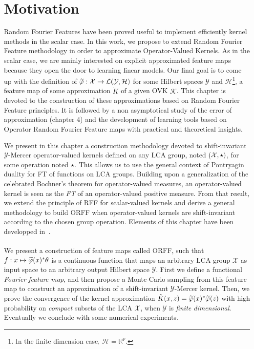 
\section{Motivation}
\label{sec:motivations}
Random Fourier Features have been proved useful to implement efficiently kernel
methods in the scalar case. In this work, we propose to extend Random Fourier
Feature methodology in order to approximate Operator-Valued Kernels. As in the
scalar case, we are mainly interested on explicit approximated feature maps
because they open the door to learning linear models. Our final goal is to come
up with the definition of $\tildePhi{\omega}: \mathcal{X} \to
\mathcal{L}(\mathcal{Y},\mathcal{H})$ for some Hilbert spaces $\mathcal{Y}$ and
$\mathcal{H}$\footnote{In the finite dimension case, $\mathcal{H}=
\mathbb{R}^p$.}, a feature map of some approximation $\tilde{K}$ of a given
\acs{OVK} $\mathcal{K}$.  This chapter is devoted to the construction of these
approximations based on Random Fourier Feature principles. It is followed by a
non asymptotical study of the error of approximation (chapter 4) and the
development of learning tools based on Operator Random Fourier Feature maps
with practical and theoretical insights. 

We present in this chapter a construction methodology devoted to
shift-invariant $\mathcal{Y}$-Mercer operator-valued kernels defined on any
\acf{LCA} group, noted ($\mathcal{X}, \star)$, for some operation noted
$\star$. This allows us to use the general context of Pontryagin duality for
\acl{FT} of functions on \acs{LCA} groups. Building upon a generalization of
the celebrated Bochner's theorem for operator-valued measures, an
operator-valued kernel is seen as the \emph{\acl{FT}} of an operator-valued
positive measure. From that result, we extend the principle of \acs{RFF} for
scalar-valued kernels and derive a general methodology to build \acf{ORFF} when
operator-valued kernels are shift-invariant according to the chosen group
operation. Elements of this chapter have been developped
in~\citet{brault2016random}.
\paragraph{}
We present a construction of feature maps called \acf{ORFF}, such that $f:
x\mapsto \tildePhi{\omega}(x)^\adjoint \theta$ is a continuous function that
maps an arbitrary \acs{LCA} group $\mathcal{X}$ as input space to an arbitrary
output Hilbert space $\mathcal{Y}$. First we define a functional \emph{Fourier
feature map}, and then propose a Monte-Carlo sampling from this feature map to
construct an approximation of a shift-invariant $\mathcal{Y}$-Mercer kernel.
Then, we prove the convergence of the kernel approximation
$\tilde{K}(x,z)=\tildePhi{\omega}(x)^\adjoint \tildePhi{\omega}(z)$ with high
probability on \emph{compact} subsets of the \acs{LCA} $\mathcal{X}$, when
$\mathcal{Y}$ is \emph{finite dimensional}. Eventually we conclude with some
numerical experiments.

